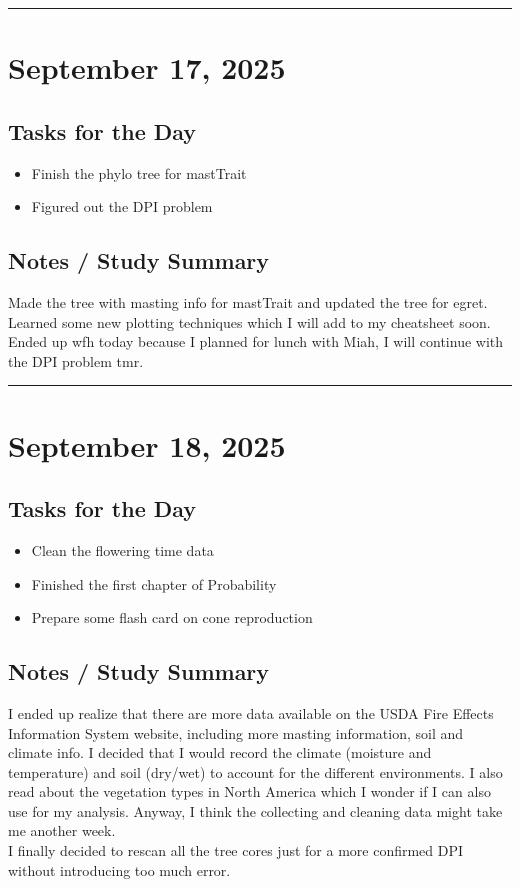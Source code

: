 \documentclass[12pt]{article}
\begin{document}
\vspace{1em}
\hrule
\vspace{1em}

\section*{September 17, 2025}

\subsection*{Tasks for the Day}
\begin{itemize}
    \item Finish the phylo tree for mastTrait
    \item Figured out the DPI problem
\end{itemize}
\subsection*{Notes / Study Summary}
Made the tree with masting info for mastTrait and updated the tree for egret. Learned some new plotting techniques which I will add to my cheatsheet soon.\\
Ended up wfh today because I planned for lunch with Miah, I will continue with the DPI problem tmr.

\vspace{1em}
\hrule
\vspace{1em}

\section*{September 18, 2025}

\subsection*{Tasks for the Day}
\begin{itemize}
    \item Clean the flowering time data
    \item Finished the first chapter of Probability
    \item Prepare some flash card on cone reproduction
\end{itemize}
\subsection*{Notes / Study Summary}
I ended up realize that there are more data available on the USDA Fire Effects Information System website, including more masting information, soil and climate info. I decided that I would record the climate (moisture and temperature) and soil (dry/wet) to account for the different environments. I also read about the vegetation types in North America which I wonder if I can also use for my analysis. Anyway, I think the collecting and cleaning data might take me another week.\\
I finally decided to rescan all the tree cores just for a more confirmed DPI without introducing too much error.\\
\end{document}
